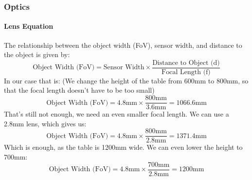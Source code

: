 \subsubsection{Optics}\label{subsubsec:lens}

\paragraph{Lens Equation}\label{par:lens_equation}

The relationship between the object width (FoV), sensor width, and distance to the object is given by:
\begin{equation}
    \text{Object Width (FoV)} = \text{Sensor Width} \times \frac{\text{Distance to Object (d)}}{\text{Focal Length (f)}}\label{eq:lens_equation}
\end{equation}
In our case that is:
(We change the height of the table from 600mm to 800mm, so that the focal length doesn't have to be too small)
\begin{equation}
    \label{eq:object_width_general}
    \text{Object Width (FoV)} = 4.8\text{mm} \times \frac{800\text{mm}}{3.6\text{mm}} = 1066.6\text{mm}
\end{equation}
That's still not enough, we need an even smaller focal length.
We can use a 2.8mm lens, which gives us:
\begin{equation}
    \label{eq:object_width_2.8mm}
    \text{Object Width (FoV)} = 4.8\text{mm} \times \frac{800\text{mm}}{2.8\text{mm}} = 1371.4\text{mm}
\end{equation}
Which is enough, as the table is 1200mm wide.
We can even lower the height to 700mm:
\begin{equation}
    \label{eq:object_width_2.8mm_700mm}
    \text{Object Width (FoV)} = 4.8\text{mm} \times \frac{700\text{mm}}{2.8\text{mm}} = 1200\text{mm}
\end{equation}
